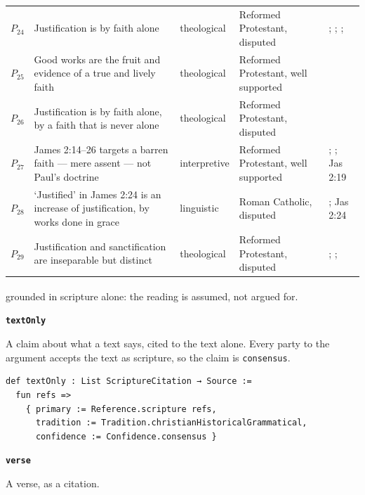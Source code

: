 \documentclass[11pt]{article}
\begin{document}
\begin{longtable}{@{}r >{\raggedright\arraybackslash}p{} l >{\raggedright\arraybackslash}p{} >{\raggedright\arraybackslash}p{}@{}}
$P_{24}$ & Justification is by faith alone & theological & Reformed Protestant, disputed & \cite[XI.2]{westminster-confession-1647}; \cite[III.xi.19]{calvin-institutes-1960}; \cite[8.6]{hilary-commentary-matthew-2013}; \cite[Homily 20, Of Humility]{basil-ascetical-works-1999} \\
$P_{25}$ & Good works are the fruit and evidence of a true and lively faith & theological & Reformed Protestant, well supported & \cite[XVI.2]{westminster-confession-1647} \\
$P_{26}$ & Justification is by faith alone, by a faith that is never alone & theological & Reformed Protestant, disputed & \cite[XI.2]{westminster-confession-1647} \\
$P_{27}$ & James 2:14–26 targets a barren faith — mere assent — not Paul's doctrine & interpretive & Reformed Protestant, well supported & \cite[ad loc. Jas 2:14]{moo-james-2000}; \cite[ad loc. Jas 2:24]{johnson-james-1995}; Jas 2:19 \\
$P_{28}$ & ‘Justified’ in James 2:24 is an increase of justification, by works done in grace & linguistic & Roman Catholic, disputed & \cite[Trent, Session VI (1547), Decree on Justification, ch. 10]{tanner-decrees-1990}; Jas 2:24 \\
$P_{29}$ & Justification and sanctification are inseparable but distinct & theological & Reformed Protestant, disputed & \cite[XIII.1]{westminster-confession-1647}; \cite[III.xi.6]{calvin-institutes-1960}; \cite[Epistle to Diognetus 9]{roberts-ante-nicene-fathers-1-1885} \\
\bottomrule
\end{longtable}

\noindent\footnotesize \textsuperscript{\dag} grounded in scripture alone: the reading is assumed, not argued for.
\normalsize

\par\medskip\noindent\textbf{\texttt{text\allowbreak{}Only}}\par\nobreak\noindent
A claim about what a text says, cited to the text alone. Every party to the argument accepts the text as scripture, so the claim is \texttt{consensus}.

{\small\begin{verbatim}
def textOnly : List ScriptureCitation → Source :=
  fun refs =>
    { primary := Reference.scripture refs,
      tradition := Tradition.christianHistoricalGrammatical,
      confidence := Confidence.consensus }
\end{verbatim}}
\par\medskip\noindent\textbf{\texttt{verse}}\par\nobreak\noindent
A verse, as a citation.
\end{document}
